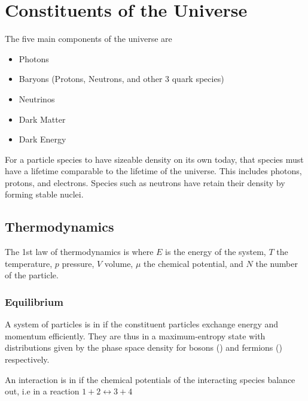 \documentclass{article}
\begin{document}
\section{Constituents of the Universe}
The five main components of the universe are 
\begin{itemize}
    \item Photons
    \item Baryons (Protons, Neutrons, and other 3 quark species)
    \item Neutrinos
    \item Dark Matter 
    \item Dark Energy
\end{itemize}
For a particle species to have sizeable density on its own today, that species must have a lifetime comparable to the lifetime of the universe. This includes photons, protons, and electrons. Species such as neutrons have retain their density by forming stable nuclei. 

\subsection{Thermodynamics}
\begin{definition}
The 1st law of thermodynamics is 
where $E$ is the energy of the system, $T$ the temperature, $p$ pressure, $V$ volume, $\mu$ the chemical potential, and $N$ the number of the particle. 
\end{definition}

\subsubsection*{Equilibrium}
\begin{definition}
A system of particles is in  if the constituent particles exchange energy and momentum efficiently. They are thus in a maximum-entropy state with distributions given by 
the phase space density for bosons () and fermions () respectively. 
\end{definition}

\begin{definition}
An interaction is in  if the chemical potentials of the interacting species balance out, i.e in a reaction $1 + 2 \leftrightarrow 3 + 4$
\end{definition}
\end{document}
